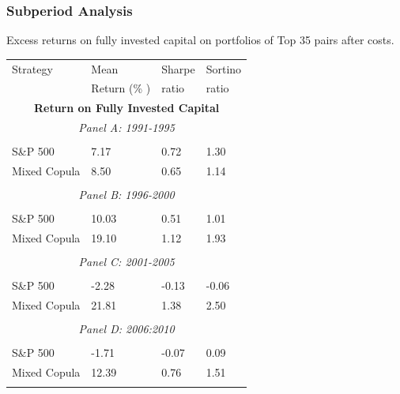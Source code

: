 \documentclass[pdf,9pt,xcolor=dvipsnames,hide notes]{beamer}
\begin{document}
\begin{frame}

\frametitle{Subperiod Analysis}

\begin{threeparttable}[H]
\centering \tiny
\caption{Excess returns on fully invested capital on portfolios of Top 35 pairs after costs. }
\begin{tabularx}{\textwidth}{@{\extracolsep{\fill}}llll@{}}
	\toprule
	Strategy & Mean  & Sharpe & Sortino \\
	& Return (\% ) & ratio &  ratio     \\
	\midrule
	\multicolumn{4}{c}{\textbf{Return on Fully Invested Capital}} \\
	\multicolumn{4}{c}{\textit{Panel A: 1991-1995}} \\
	&       &       &       \\
	S\&P 500 & 7.17  & 0.72  & 1.30 \\
	Mixed Copula & 8.50  & 0.65  & 1.14 \\
	\multicolumn{1}{r}{} & \multicolumn{1}{r}{} & \multicolumn{1}{r}{} & \multicolumn{1}{r}{} \\
	\multicolumn{4}{c}{\textit{Panel B: 1996-2000}} \\
	&       &       &       \\
	S\&P 500 & 10.03  & 0.51  & 1.01 \\
	Mixed Copula & 19.10  & 1.12  & 1.93 \\
	\multicolumn{1}{r}{} & \multicolumn{1}{r}{} & \multicolumn{1}{r}{} & \multicolumn{1}{r}{} \\
	\multicolumn{4}{c}{\textit{Panel C: 2001-2005}} \\
	&       &       &       \\
	S\&P 500 & -2.28  & \cellcolor{Melon} -0.13  & -0.06 \\
	Mixed Copula & 21.81  & \cellcolor{corn} 1.38  & 2.50 \\
	\multicolumn{1}{r}{} & \multicolumn{1}{r}{} & \multicolumn{1}{r}{} & \multicolumn{1}{r}{} \\
	\multicolumn{4}{c}{\textit{Panel D: 2006:2010}} \\
	&       &       &       \\
	S\&P 500 & -1.71  & \cellcolor{Melon} -0.07  & 0.09 \\
	Mixed Copula & 12.39  & \cellcolor{corn} 0.76  & 1.51 \\
	\multicolumn{1}{r}{} & \multicolumn{1}{r}{} & \multicolumn{1}{r}{} & \multicolumn{1}{r}{} \\

\end{tabularx}
\end{threeparttable}
\end{frame}
\end{document}
